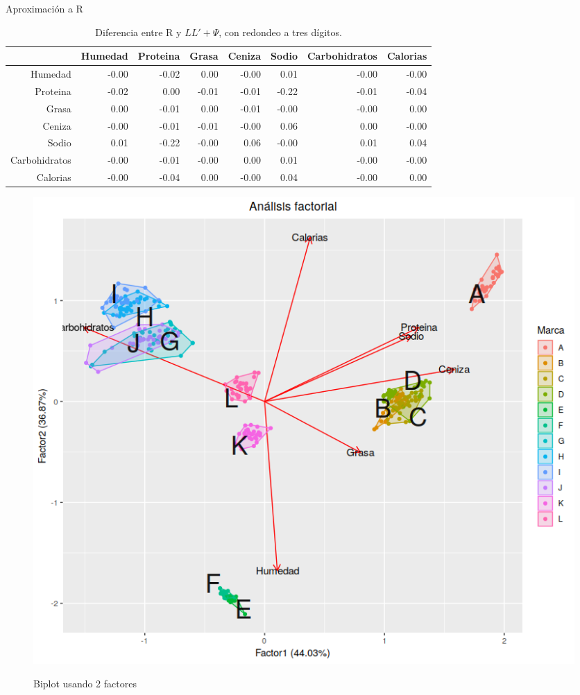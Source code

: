 \documentclass[pdf]{beamer}
\begin{document}
\begin{frame}{Aproximación a R}
\begin{table}[ht]
\begin{adjustbox}{width= 4in,center}
\centering
\begin{tabular}{rrrrrrrr}
  \hline
 & Humedad & Proteina & Grasa & Ceniza & Sodio & Carbohidratos & Calorias \\ 
  \hline
Humedad & -0.00 & -0.02 & 0.00 & -0.00 & 0.01 & -0.00 & -0.00 \\ 
  Proteina & -0.02 & 0.00 & -0.01 & -0.01 & -0.22 & -0.01 & -0.04 \\ 
  Grasa & 0.00 & -0.01 & 0.00 & -0.01 & -0.00 & -0.00 & 0.00 \\ 
  Ceniza & -0.00 & -0.01 & -0.01 & -0.00 & 0.06 & 0.00 & -0.00 \\ 
  Sodio & 0.01 & -0.22 & -0.00 & 0.06 & -0.00 & 0.01 & 0.04 \\ 
  Carbohidratos & -0.00 & -0.01 & -0.00 & 0.00 & 0.01 & -0.00 & -0.00 \\ 
  Calorias & -0.00 & -0.04 & 0.00 & -0.00 & 0.04 & -0.00 & 0.00 \\ 
   \hline
\end{tabular}
\end{adjustbox}
	\label{tabla:aproximacion}
	\caption{Diferencia entre R y $LL' + \Psi$, con redondeo a tres dígitos.}
\end{table}
\end{frame}

\begin{frame}
\begin{figure}[h]
\centering
	\includegraphics[scale=.35]{images/biplotFactores.png} 
	\label{i_biplot_Factores}
	\caption{Biplot usando 2 factores}
\end{figure}
\end{frame}
\end{document}
